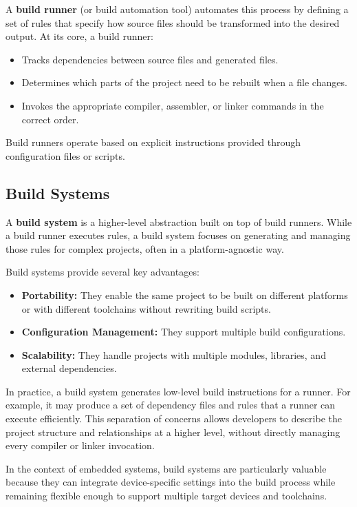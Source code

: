 A \textbf{build runner} (or build automation tool) automates this process by defining a set of rules that specify how source files should be transformed into the desired output.
At its core, a build runner:
\begin{itemize}
	\item Tracks dependencies between source files and generated files.
	\item Determines which parts of the project need to be rebuilt when a file changes.
	\item Invokes the appropriate compiler, assembler, or linker commands in the correct order.
\end{itemize}

Build runners operate based on explicit instructions provided through configuration files or scripts.
\subsection{Build Systems}
A \textbf{build system} is a higher-level abstraction built on top of build runners.
While a build runner executes rules, a build system focuses on generating and managing those rules for complex projects, often in a platform-agnostic way.

Build systems provide several key advantages:
\begin{itemize}
	\item \textbf{Portability:} They enable the same project to be built on different platforms or with different toolchains without rewriting build scripts.
	\item \textbf{Configuration Management:} They support multiple build configurations.
	\item \textbf{Scalability:} They handle projects with multiple modules, libraries, and external dependencies.
\end{itemize}

In practice, a build system generates low-level build instructions for a runner.
For example, it may produce a set of dependency files and rules that a runner can execute efficiently.
This separation of concerns allows developers to describe the project structure and relationships at a higher level, without directly managing every compiler or linker invocation.

In the context of embedded systems, build systems are particularly valuable because they can integrate device-specific settings into the build process while remaining flexible enough to support multiple target devices and toolchains.

